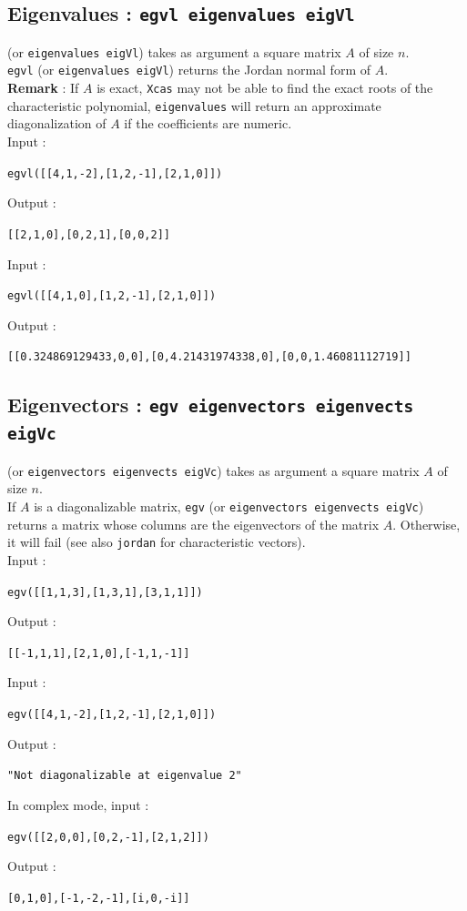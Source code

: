 \documentclass[a4paper,11pt]{book}
\begin{document}
\subsection{Eigenvalues : {\tt egvl eigenvalues eigVl}}
 (or {\tt eigenvalues eigVl}) takes as argument a 
square matrix $A$ of size $n$.\\
{\tt egvl} (or {\tt eigenvalues eigVl}) returns the Jordan normal
form of $A$.\\
{\bf Remark} : If $A$ is exact, {\tt Xcas} may not be able
to find the exact roots of the characteristic polynomial, 
{\tt eigenvalues} will return an approximate diagonalization of $A$ if the
coefficients are numeric.\\
Input :
\begin{center}{\tt egvl([[4,1,-2],[1,2,-1],[2,1,0]])}\end{center}
Output :
\begin{center}{\tt [[2,1,0],[0,2,1],[0,0,2]] }\end{center}
Input :
\begin{center}{\tt egvl([[4,1,0],[1,2,-1],[2,1,0]])}\end{center}
Output :
\begin{center}{\tt [[0.324869129433,0,0],[0,4.21431974338,0],[0,0,1.46081112719]]}\end{center}

\subsection{Eigenvectors : {\tt egv eigenvectors eigenvects \\
eigVc}}
 (or {\tt eigenvectors eigenvects eigVc}) takes as argument 
a square matrix $A$ of size $n$.\\
If $A$ is a diagonalizable matrix, {\tt egv} (or 
{\tt eigenvectors eigenvects eigVc}) returns a matrix whose columns are the 
eigenvectors of the matrix $A$. Otherwise, it will fail (see also
{\tt jordan} for characteristic vectors).\\ 
Input :
\begin{center}{\tt egv([[1,1,3],[1,3,1],[3,1,1]])}\end{center}
Output :
\begin{center}{\tt [[-1,1,1],[2,1,0],[-1,1,-1]] }\end{center}
Input :
\begin{center}{\tt egv([[4,1,-2],[1,2,-1],[2,1,0]])}\end{center}
Output :
\begin{center}{\tt "Not diagonalizable at eigenvalue 2"}\end{center}
In complex mode, input :
\begin{center}{\tt egv([[2,0,0],[0,2,-1],[2,1,2]])}\end{center}
Output :
\begin{center}{\tt [0,1,0],[-1,-2,-1],[i,0,-i]]}\end{center}
\end{document}
